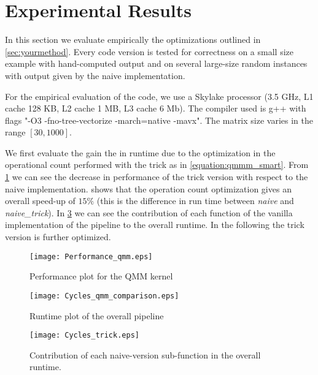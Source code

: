 \section{Experimental Results}\label{sec:exp}
\graphicspath{{../../plots/}}

In this section we evaluate empirically the optimizations outlined in \cref{sec:yourmethod}. Every code version is tested for correctness on a small size example with hand-computed output and on several large-size random instances with output given by the naive implementation.

For the empirical evaluation of the code, we use a Skylake processor (3.5 GHz, L1 cache 128 KB, L2 cache 1 MB, L3 cache 6 Mb). The compiler used is g++ with flags "-O3 -fno-tree-vectorize -march=native -mavx". The matrix size varies in the range $[30,1000]$.

We first evaluate the gain the in runtime due to the optimization in the operational count performed with the trick as in \cref{equation:qmmm_smart}. From \cref{figure:performance_qmm_kernel} we can see the decrease in performance of the trick version with respect to the naive implementation.  shows that the operation count optimization gives an overall speed-up of $15 \%$ (this is the difference in run time between \emph{naive} and \emph{naive\_trick}). In \cref{figure:Cycles_trick} we can see the contribution of each function of the vanilla implementation of the pipeline to the overall runtime. In the following the trick version is further optimized.

\begin{figure}[h]
\texttt{[image: Performance\_qmm.eps]}
\caption{Performance plot for the QMM kernel}
\label{figure:performance_qmm_kernel}
\end{figure}

\begin{figure}[h]
\texttt{[image: Cycles\_qmm\_comparison.eps]}
\caption{Runtime plot of the overall pipeline}
\label{figure:cycles_qmm_comparison}
\end{figure}

\begin{figure}[h]
\texttt{[image: Cycles\_trick.eps]}
\caption{Contribution of each naive-version sub-function in the overall runtime.} 
\label{figure:Cycles_trick}
\end{figure}


